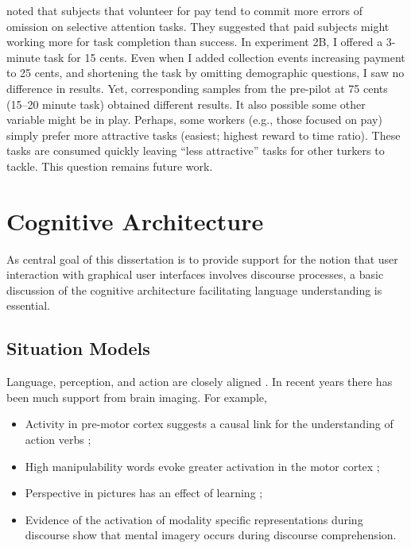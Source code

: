  \citet{Rush:1978tw}  noted that subjects that volunteer for pay tend to commit more errors of omission on selective attention tasks. They suggested that paid subjects might working more for task completion than success. In experiment 2B, I offered a 3-minute task for 15 cents. Even when I added collection events increasing payment to 25 cents, and shortening the task by omitting demographic questions, I saw no difference in results. Yet, corresponding samples from the pre-pilot at 75 cents (15--20 minute task) obtained different results. It also possible some other variable might be in play. Perhaps, some workers (e.g., those focused on pay) simply prefer more attractive tasks (easiest; highest reward to time ratio). These tasks are consumed quickly leaving ``less attractive'' tasks for other turkers to tackle. This question remains future work.

\section{Cognitive Architecture}
\label{cognitivearchitecture}

As central goal of this dissertation is to provide support for the notion that user interaction with graphical user interfaces involves discourse processes, a basic discussion of the cognitive architecture facilitating language understanding is essential.

\subsection{Situation Models}
\label{situationmodels}

Language, perception, and action are closely aligned  \citep{Lakoff:2008tq}.  In recent years there has been much support from brain imaging. For example,

\begin{itemize}
\item Activity in pre-motor cortex suggests a causal link for the understanding of action verbs \citep{Willems:2011gp};
\item High manipulability words evoke greater activation in the motor cortex \citep{Madan:2012ja};
\item Perspective in pictures has an effect of learning \citep{deNooijer:2013jc};
\item Evidence of the activation of modality specific representations during discourse show that mental imagery occurs during discourse comprehension.\citep{Kurby:2013tp}
\end{itemize}

